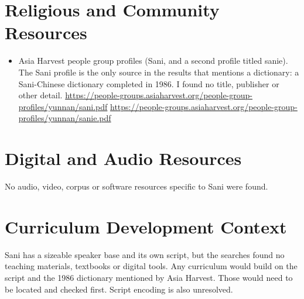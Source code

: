 \documentclass[12pt]{article}
\begin{document}
\section{Religious and Community Resources}
\begin{itemize}
\item Asia Harvest people group profiles (Sani, and a second profile titled sanie). The Sani profile is the only source in the results that mentions a dictionary: a Sani-Chinese dictionary completed in 1986. I found no title, publisher or other detail. \url{https://people-groups.asiaharvest.org/people-group-profiles/yunnan/sani.pdf} \quad \url{https://people-groups.asiaharvest.org/people-group-profiles/yunnan/sanie.pdf}
\end{itemize}

\section{Digital and Audio Resources}
No audio, video, corpus or software resources specific to Sani were found.

\section{Curriculum Development Context}
Sani has a sizeable speaker base and its own script, but the searches found no teaching materials, textbooks or digital tools. Any curriculum would build on the script and the 1986 dictionary mentioned by Asia Harvest. Those would need to be located and checked first. Script encoding is also unresolved.
\end{document}
